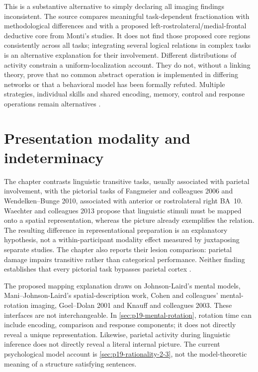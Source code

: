 This is a substantive alternative to simply declaring all imaging
findings inconsistent. The source compares meaningful task-dependent
fractionation with methodological differences and with a proposed
left-rostrolateral/medial-frontal deductive core from Monti's studies.
It does not find those proposed core regions consistently across all
tasks; integrating several logical relations in complex tasks is an
alternative explanation for their involvement. Different distributions
of activity constrain a uniform-localization account. They do not,
without a linking theory, prove that no common abstract operation is
implemented in differing networks or that a behavioral model has been
formally refuted. Multiple strategies, individual skills and shared
encoding, memory, control and response operations remain alternatives
\cite[pp.~3494--3495]{PradoChadhaBooth2011DeductionMeta}.

\section{Presentation modality and indeterminacy}
\label{sec:p19-r14-modality}

The chapter contrasts linguistic transitive tasks, usually associated
with parietal involvement, with the pictorial tasks of Fangmeier and
colleagues 2006 and Wendelken--Bunge 2010, associated with anterior or
rostrolateral right BA~10. Waechter and colleagues 2013 propose that
linguistic stimuli must be mapped onto a spatial representation, whereas
the picture already exemplifies the relation. The resulting difference
in representational preparation is an explanatory hypothesis, not a
within-participant modality effect measured by juxtaposing separate
studies. The chapter also reports their lesion comparison: parietal
damage impairs transitive rather than categorical performance. Neither
finding establishes that every pictorial task bypasses parietal cortex
\cite[pp.~120, 122]{Goel2021RationalityBrain}.

The proposed mapping explanation draws on Johnson-Laird's mental models,
Mani--Johnson-Laird's spatial-description work, Cohen and colleagues'
mental-rotation imaging, Goel--Dolan 2001 and Knauff and colleagues 2003.
These interfaces are not interchangeable. In
\cref{sec:p19-mental-rotation}, rotation time can include encoding,
comparison and response components; it does not directly reveal a unique
representation. Likewise, parietal activity during linguistic inference
does not directly reveal a literal internal picture. The current
psychological model account is \cref{sec:p19-rationality-2-3}, not the
model-theoretic meaning of a structure satisfying sentences.

